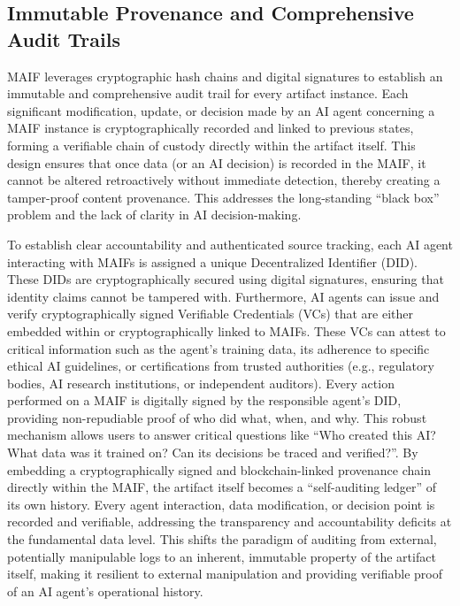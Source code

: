 \documentclass[conference]{IEEEtran}
\begin{document}
\subsection{Immutable Provenance and Comprehensive Audit Trails}

MAIF leverages cryptographic hash chains and digital signatures to establish an immutable and comprehensive audit trail for every artifact instance\cite{ref9}. Each significant modification, update, or decision made by an AI agent concerning a MAIF instance is cryptographically recorded and linked to previous states, forming a verifiable chain of custody directly within the artifact itself. This design ensures that once data (or an AI decision) is recorded in the MAIF, it cannot be altered retroactively without immediate detection, thereby creating a tamper-proof content provenance\cite{ref9}. This addresses the long-standing ``black box'' problem and the lack of clarity in AI decision-making\cite{ref4}.

To establish clear accountability and authenticated source tracking, each AI agent interacting with MAIFs is assigned a unique Decentralized Identifier (DID)\cite{ref4}. These DIDs are cryptographically secured using digital signatures, ensuring that identity claims cannot be tampered with\cite{ref4}. Furthermore, AI agents can issue and verify cryptographically signed Verifiable Credentials (VCs) that are either embedded within or cryptographically linked to MAIFs. These VCs can attest to critical information such as the agent's training data, its adherence to specific ethical AI guidelines, or certifications from trusted authorities (e.g., regulatory bodies, AI research institutions, or independent auditors)\cite{ref4}. Every action performed on a MAIF is digitally signed by the responsible agent's DID, providing non-repudiable proof of who did what, when, and why. This robust mechanism allows users to answer critical questions like ``Who created this AI? What data was it trained on? Can its decisions be traced and verified?''\cite{ref4}. By embedding a cryptographically signed and blockchain-linked provenance chain directly within the MAIF, the artifact itself becomes a ``self-auditing ledger'' of its own history. Every agent interaction, data modification, or decision point is recorded and verifiable, addressing the transparency and accountability deficits at the fundamental data level. This shifts the paradigm of auditing from external, potentially manipulable logs to an inherent, immutable property of the artifact itself, making it resilient to external manipulation and providing verifiable proof of an AI agent's operational history.
\end{document}
